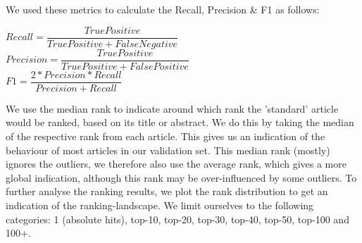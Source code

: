 \documentclass[../../Thesis.tex]{subfiles}
\begin{document}
We used these metrics to calculate the Recall, Precision \& F1 as follows:\\
\begin{jumpin}
$Recall = \dfrac{True Positive}{True Positive + False Negative}$\vspace{0.1in}\\
$Precision = \dfrac{True Positive}{True Positive + False Positive}$\vspace{0.1in}\\
$F1 = \dfrac{2 * Precision * Recall}{Precision + Recall}$
\end{jumpin}
We use the median rank to indicate around which rank the 'standard' article would be ranked, based on its title or abstract. We do this by taking the median of the respective rank from each article. This gives us an indication of the behaviour of most articles in our validation set. This median rank (mostly) ignores the outliers, we therefore also use the average rank, which gives a more global indication, although this rank may be over-influenced by some outliers.
To further analyse the ranking results, we plot the rank distribution to get an indication of the ranking-landscape. We limit ourselves to the following categories: 1 (absolute hits), top-10, top-20, top-30, top-40, top-50,  top-100 and 100+. 
\end{document}
